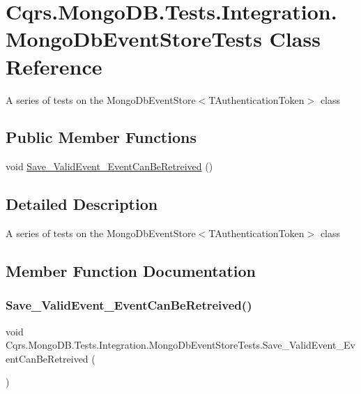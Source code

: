 \hypertarget{classCqrs_1_1MongoDB_1_1Tests_1_1Integration_1_1MongoDbEventStoreTests}{}\section{Cqrs.\+Mongo\+D\+B.\+Tests.\+Integration.\+Mongo\+Db\+Event\+Store\+Tests Class Reference}
\label{classCqrs_1_1MongoDB_1_1Tests_1_1Integration_1_1MongoDbEventStoreTests}


A series of tests on the Mongo\+Db\+Event\+Store$<$\+T\+Authentication\+Token$>$ class  


\subsection*{Public Member Functions}
\begin{DoxyCompactItemize}
\item 
void \hyperlink{classCqrs_1_1MongoDB_1_1Tests_1_1Integration_1_1MongoDbEventStoreTests_a399ae37cf9f492b3e55d1480f97b1520}{Save\+\_\+\+Valid\+Event\+\_\+\+Event\+Can\+Be\+Retreived} ()
\end{DoxyCompactItemize}


\subsection{Detailed Description}
A series of tests on the Mongo\+Db\+Event\+Store$<$\+T\+Authentication\+Token$>$ class 



\subsection{Member Function Documentation}
\mbox{\label{classCqrs_1_1MongoDB_1_1Tests_1_1Integration_1_1MongoDbEventStoreTests_a399ae37cf9f492b3e55d1480f97b1520}} 
\subsubsection{\texorpdfstring{Save\+\_\+\+Valid\+Event\+\_\+\+Event\+Can\+Be\+Retreived()}{Save\_ValidEvent\_EventCanBeRetreived()}}
{\footnotesize\ttfamily void Cqrs.\+Mongo\+D\+B.\+Tests.\+Integration.\+Mongo\+Db\+Event\+Store\+Tests.\+Save\+\_\+\+Valid\+Event\+\_\+\+Event\+Can\+Be\+Retreived (\begin{DoxyParamCaption}{ }\end{DoxyParamCaption})}

